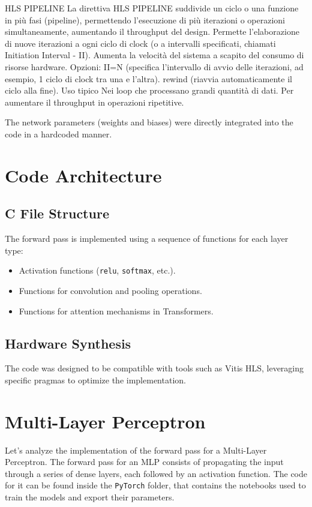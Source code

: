 \documentclass{article}
\begin{document}
HLS PIPELINE
La direttiva HLS PIPELINE suddivide un ciclo o una funzione in più fasi (pipeline), permettendo l'esecuzione di più iterazioni o operazioni simultaneamente, aumentando il throughput del design.
Permette l'elaborazione di nuove iterazioni a ogni ciclo di clock (o a intervalli specificati, chiamati Initiation Interval - II).
Aumenta la velocità del sistema a scapito del consumo di risorse hardware.
Opzioni:
II=N (specifica l'intervallo di avvio delle iterazioni, ad esempio, 1 ciclo di clock tra una e l'altra).
rewind (riavvia automaticamente il ciclo alla fine).
Uso tipico
Nei loop che processano grandi quantità di dati.
Per aumentare il throughput in operazioni ripetitive.

The network parameters (weights and biases) were directly integrated into the code in a hardcoded manner.

\section{Code Architecture}
\subsection{C File Structure}
The forward pass is implemented using a sequence of functions for each layer type:
\begin{itemize}
    \item Activation functions (\texttt{relu}, \texttt{softmax}, etc.).
    \item Functions for convolution and pooling operations.
    \item Functions for attention mechanisms in Transformers.
\end{itemize}


\subsection{Hardware Synthesis}
The code was designed to be compatible with tools such as Vitis HLS, leveraging specific pragmas to optimize the implementation.

\section{Multi-Layer Perceptron}
Let's analyze the implementation of the forward pass for a Multi-Layer Perceptron. The forward pass for an MLP consists of propagating the input through a series of dense layers, each followed by an activation function.
The code for it can be found inside the \texttt{PyTorch} folder, that contains the notebooks used to train the models and export their parameters.
\end{document}
